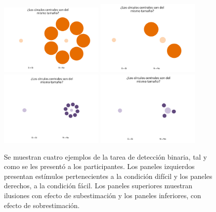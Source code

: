 \begin{itemize}
\begin{itemize}
\begin{figure}[th]
\centering
\includegraphics[width=0.45\textwidth]{Figures/Ejemplo_EnsayoYN_1} \includegraphics[width=0.45\textwidth]{Figures/Ejemplo_EnsayoYN_2}
\includegraphics[width=0.45\textwidth]{Figures/Ejemplo_EnsayoYN_4} \includegraphics[width=0.45\textwidth]{Figures/Ejemplo_EnsayoYN_3}
\caption[Presentación de ensayos con tarea de detección binaria]{Se muestran cuatro ejemplos de la tarea de detección binaria, tal y como se les presentó a los participantes. Los paneles izquierdos presentan estímulos pertenecientes a la condición difícil y los paneles derechos, a la condición fácil. Los paneles superiores muestran ilusiones con efecto de subestimación y los paneles inferiores, con efecto de sobrestimación.}
\label{fig:Ejem_YN}
\end{figure}


\end{itemize}
\end{itemize}
